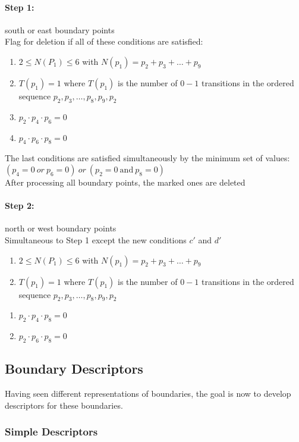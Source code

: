 \paragraph{Step 1:} south or east boundary points\\
Flag for deletion if all of these conditions are satisfied:
\begin{enumerate}[label={\alph*)}]
\item $2\leq N(P_1)\leq 6$ with $N(p_1)=p_2 + p_3 + \ldots + p_9$
\item $T(p_1)=1$ where $T(p_1)$ is the number of $0-1$ transitions in the ordered sequence $p_2,p_3,\ldots ,p_8,p_9,p_2$
\item $p_2 \cdot p_4 \cdot p_6 = 0$
\item $p_4 \cdot p_6 \cdot p_8 = 0$
\end{enumerate}
The last conditions are satisfied simultaneously by the minimum set of values: $(p_4=0\ or\ p_6=0)\ or \ (p_2=0\ \text{and} \ p_8=0)$\\
After processing all boundary points, the marked ones are deleted\\
\paragraph{Step 2:} north or west boundary points\\
Simultaneous to Step 1 except the new conditions $c'$ and $d'$\\
\begin{enumerate}[label={\alph*)}]
\item $2\leq N(P_1)\leq 6$ with $N(p_1)=p_2 + p_3 + \ldots + p_9$
\item $T(p_1)=1$ where $T(p_1)$ is the number of $0-1$ transitions in the ordered sequence $p_2,p_3,\ldots ,p_8,p_9,p_2$
\end{enumerate}
\begin{enumerate}[label={\alph*')},resume]
\item $p_2 \cdot p_4 \cdot p_8 = 0$
\item $p_2 \cdot p_6 \cdot p_8 = 0$
\end{enumerate}

\subsection{Boundary Descriptors}
\label{sec:boundaryDescriptors}
Having seen different representations of boundaries, the goal is now to develop descriptors for these boundaries.
\subsubsection{Simple Descriptors}

